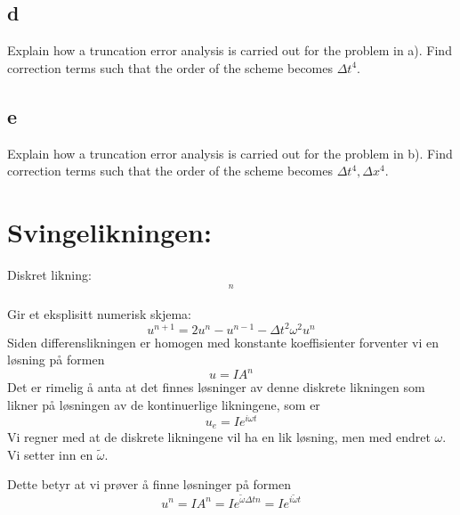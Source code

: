 \documentclass[a4paper, 10pt]{article}
\begin{document}
\subsection{d} 
Explain how a truncation error analysis is carried out for the problem in a). Find correction terms such that the order of the scheme becomes $\Delta t^4$.

\subsection{e} 
Explain how a truncation error analysis is carried out for the problem in b). Find correction terms such that the order of the scheme becomes $\Delta t^4,\Delta x^4$.

\section{Svingelikningen:}
Diskret likning:
\begin{equation}
	[D_t D_t u +\omega^2 u = 0 ]^n
\end{equation}

Gir et eksplisitt numerisk skjema:
\begin{equation}
	u^{n+1} = 2u^n - u^{n-1} - \Delta t^2\omega^2 u^n
\end{equation}
Siden differenslikningen er homogen med konstante koeffisienter forventer vi en løsning på formen
\begin{equation}
	u = IA^n
\end{equation}
Det er rimelig å anta at det finnes løsninger av denne diskrete likningen som likner på løsningen av de kontinuerlige likningene, som er   
\begin{equation}
	u_e = Ie^{i\omega t}
\end{equation}
Vi regner med at de diskrete likningene vil ha en lik løsning, men med endret $\omega$. Vi setter inn en $\tilde{\omega}$.

Dette betyr at vi prøver å finne løsninger på formen
\begin{equation}
	u^n  =IA^n = Ie^{\tilde{\omega}\Delta t n} = I e^{i\tilde{\omega}t}
\end{equation}
\end{document}
